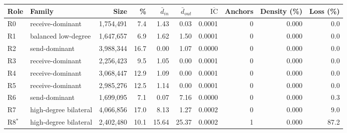\begin{tabular}{llrrrrrrrr}
\toprule
\textbf{Role} & \textbf{Family} & \textbf{Size} & \textbf{\%} & $\bar{d}_{in}$ & $\bar{d}_{out}$ & $\overline{\mathrm{IC}}$ & \textbf{Anchors} & \textbf{Density (\%)} & \textbf{Loss (\%)} \\
\midrule
R0 & receive-dominant & 1,754,491 & 7.4 & 1.43 & 0.03 & 0.0001 & 0 & 0.000 & 0.0 \\
R1 & balanced low-degree & 1,647,657 & 6.9 & 1.62 & 1.50 & 0.0001 & 0 & 0.000 & 0.0 \\
R2 & send-dominant & 3,988,344 & 16.7 & 0.00 & 1.07 & 0.0000 & 0 & 0.000 & 0.0 \\
R3 & receive-dominant & 2,256,423 & 9.5 & 1.05 & 0.00 & 0.0001 & 0 & 0.000 & 0.0 \\
R4 & receive-dominant & 3,068,447 & 12.9 & 1.09 & 0.00 & 0.0001 & 0 & 0.000 & 0.0 \\
R5 & receive-dominant & 2,985,276 & 12.5 & 1.14 & 0.00 & 0.0001 & 0 & 0.000 & 0.0 \\
R6 & send-dominant & 1,699,095 & 7.1 & 0.07 & 7.16 & 0.0000 & 0 & 0.000 & 0.3 \\
R7 & high-degree bilateral & 4,066,856 & 17.0 & 8.13 & 1.27 & 0.0002 & 0 & 0.000 & 9.0 \\
R8$^*$ & high-degree bilateral & 2,402,480 & 10.1 & 15.64 & 25.37 & 0.0002 & 1 & 0.000 & 87.2 \\
\bottomrule
\end{tabular}
